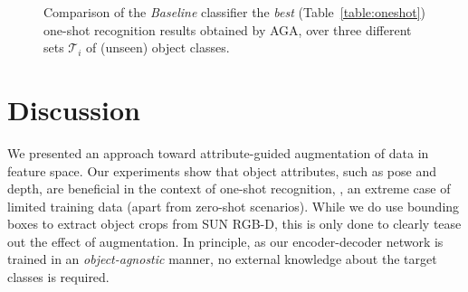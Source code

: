 \documentclass[10pt,twocolumn,letterpaper]{article}
\newcommand{\mnl}[1]{{\color{magenta}{($\leftarrow$ #1)}}}
\begin{document}
\begin{figure}
\caption{\label{fig:bestoneshot} Comparison of the \textit{Baseline} 
classifier \vs the \emph{best} (\cf Table~\ref{table:oneshot}) one-shot recognition results obtained by AGA, 
over three different sets $\mathcal{T}_i$ of (unseen) object classes.}
\end{figure}

\section{Discussion}
\label{section:discussion}

We presented an approach toward attribute-guided 
augmentation of data in feature space. Our experiments
show that object attributes, such as pose and depth, are
beneficial in the context of one-shot recognition, \ie,
an extreme case of limited training data (apart from 
zero-shot scenarios). While we do use bounding boxes 
to extract object crops from SUN RGB-D, this is only 
done to clearly tease out the effect of augmentation. 
In principle, as our encoder-decoder network is trained
in an \emph{object-agnostic} manner, no external knowledge 
about the target classes is required. 
\end{document}
